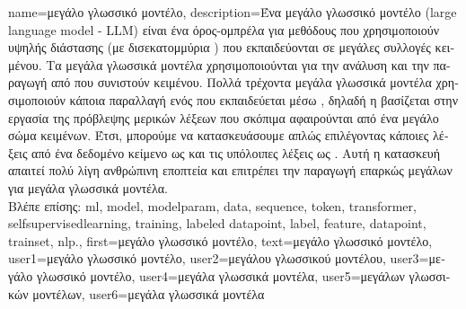 {name={\foreignlanguage{greek}{μεγάλο γλωσσικό μοντέλο}},
	description={\foreignlanguage{greek}{Ένα μεγάλο γλωσσικό μοντέλο} 
		(large language model - LLM) \foreignlanguage{greek}{είναι ένα όρος-ομπρέλα για μεθόδους}  
		\foreignlanguage{greek}{που χρησιμοποιούν}   \foreignlanguage{greek}{υψηλής 
		διάστασης (με δισεκατομμύρια} ) \foreignlanguage{greek}{που εκπαιδεύονται σε μεγάλες 
		συλλογές}  \foreignlanguage{greek}{κειμένου. Τα μεγάλα γλωσσικά μοντέλα χρησιμοποιούνται 
		για την ανάλυση και την παραγωγή}  \foreignlanguage{greek}{από}  
		\foreignlanguage{greek}{που συνιστούν}  \foreignlanguage{greek}{κειμένου}. 
		\foreignlanguage{greek}{Πολλά τρέχοντα μεγάλα γλωσσικά μοντέλα χρησιμοποιούν κάποια παραλλαγή ενός} 
		 \foreignlanguage{greek}{που εκπαιδεύεται μέσω} , 
		\foreignlanguage{greek}{δηλαδή η}  \foreignlanguage{greek}{βασίζεται στην εργασία της 
		πρόβλεψης μερικών λέξεων που σκόπιμα αφαιρούνται από ένα μεγάλο σώμα κειμένων. Έτσι, μπορούμε να 
		κατασκευάσουμε}  \foreignlanguage{greek}{απλώς επιλέγοντας κάποιες λέξεις 
		από ένα δεδομένο κείμενο ως}  \foreignlanguage{greek}{και τις υπόλοιπες λέξεις ως} 
		 . \foreignlanguage{greek}{Αυτή η κατασκευή απαιτεί 
		πολύ λίγη ανθρώπινη εποπτεία και επιτρέπει την παραγωγή επαρκώς 
		μεγάλων}  \foreignlanguage{greek}{για μεγάλα γλωσσικά μοντέλα.} 
		\\
		\foreignlanguage{greek}{Βλέπε επίσης:} \gls{ml}, \gls{model}, \gls{modelparam}, \gls{data}, \gls{sequence}, \gls{token}, 
		\gls{transformer}, \gls{selfsupervisedlearning}, \gls{training}, \gls{labeled datapoint}, \gls{label}, \gls{feature}, \gls{datapoint}, 
		\gls{trainset}, \gls{nlp}.},
	first={\foreignlanguage{greek}{μεγάλο γλωσσικό μοντέλο}},
	text={\foreignlanguage{greek}{μεγάλο γλωσσικό μοντέλο}},
	user1={\foreignlanguage{greek}{μεγάλο γλωσσικό μοντέλο}}, %
	user2={\foreignlanguage{greek}{μεγάλου γλωσσικού μοντέλου}}, %
	user3={\foreignlanguage{greek}{μεγάλο γλωσσικό μοντέλο}}, %
	user4={\foreignlanguage{greek}{μεγάλα γλωσσικά μοντέλα}}, %
	user5={\foreignlanguage{greek}{μεγάλων γλωσσικών μοντέλων}}, %
	user6={\foreignlanguage{greek}{μεγάλα γλωσσικά μοντέλα}} %
}

